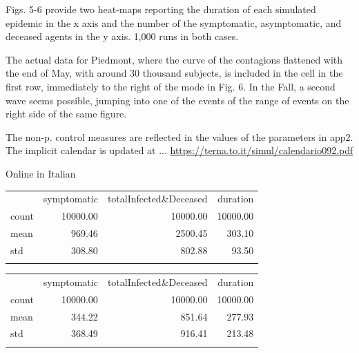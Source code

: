 \documentclass[graybox]{svmult}
\begin{document}
Figs. 5-6 provide two heat-maps reporting the duration of each simulated epidemic in the x axis and the number of the symptomatic, asymptomatic, and deceased agents in the y axis. 1,000 runs in both cases. 

The actual data for Piedmont, where the curve of the contagions flattened with the end of May, with around 30 thousand subjects, is included in the cell in the first row, immediately to the right of the mode in Fig. 6. In the Fall, a second wave seems possible, jumping into one of the events of the range of events on the right side of the same figure.

The non-p. control measures are reflected in the values of the parameters in app2. The implicit calendar is updated at ... \href{https://terna.to.it/simul/calendario092.pdf}{https://terna.to.it/simul/calendario092.pdf} 

Online in Italian

\begin{table}[t]
\center
\begin{tabular}{lrrr}
\hline\noalign{\smallskip}
{} & symptomatic & totalInfected\&Deceased & duration \\
\noalign{\smallskip}\svhline\noalign{\smallskip}
count & 10000.00 & 10000.00 & 10000.00 \\
mean & 969.46 & 2500.45 & 303.10 \\
std & 308.80 & 802.88 & 93.50 \\
\hline\noalign{\smallskip}
\end{tabular}
\label{noCTab}
\end{table}


\begin{table}[t]
\center
\begin{tabular}{lrrr}
\hline\noalign{\smallskip}
{} & symptomatic & totalInfected\&Deceased & duration \\
\noalign{\smallskip}\svhline\noalign{\smallskip}
count & 10000.00 & 10000.00 & 10000.00 \\
mean & 344.22 & 851.64 & 277.93 \\
std & 368.49 & 916.41 & 213.48 \\
\hline\noalign{\smallskip}
\end{tabular}
\label{basicCTab}
\end{table}
\end{document}

